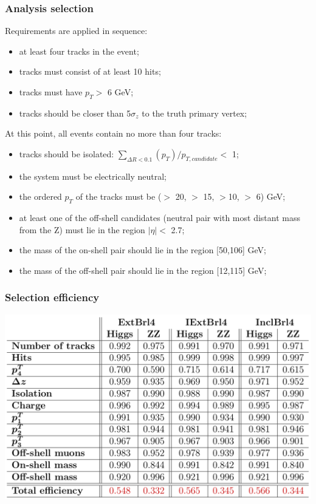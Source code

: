 \documentclass{beamer}
\begin{document}
\begin{frame}[t]
\frametitle{Analysis selection}

Requirements are applied in sequence:
\begin{itemize}
\item<1-> at least four tracks in the event;
\item<2-> tracks must consist of at least 10 hits;
\item<3-> tracks must have $p_{T} >$ 6 GeV;
\item<4-> tracks should be closer than 5$\sigma_{z}$ to the truth primary vertex;
\end{itemize}
\medskip
\pause
\pause
\pause
\pause
At this point, all events contain no more than four tracks:
\begin{itemize}
\item<6-> tracks should be isolated: $\sum_{\Delta R < 0.1} (p_{T}) / p_{T, candidate} <$ 1;
\item<7-> the system must be electrically neutral;
\item<8-> the ordered $p_{T}$ of the tracks must be ($>$ 20, $>$ 15, $>$10, $>$ 6) GeV;
\item<9-> at least one of the off-shell candidates (neutral pair with most distant mass from the Z)
must lie in the region $|\eta| <$ 2.7;
\item<10-> the mass of the on-shell pair should lie in the region [50,106] GeV;
\item<11-> the mass of the off-shell pair should lie in the region [12,115] GeV;
\end{itemize}

\end{frame}


\begin{frame}
\frametitle{Selection efficiency}
\centering
\includegraphics[width=\textwidth]{Efficiency}
\end{frame}
\end{document}
